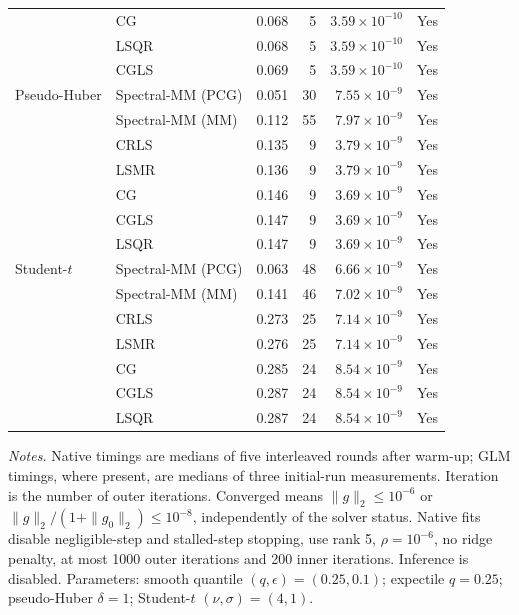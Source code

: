 \documentclass[10pt,a4paper]{article}
\begin{document}
\begin{longtable}{llrrrc}
 & CG & 0.068 & 5 & $3.59\times10^{-10}$ & Yes \\
 & LSQR & 0.068 & 5 & $3.59\times10^{-10}$ & Yes \\
 & CGLS & 0.069 & 5 & $3.59\times10^{-10}$ & Yes \\
\midrule
Pseudo-Huber & Spectral-MM (PCG) & 0.051 & 30 & $7.55\times10^{-9}$ & Yes \\
 & Spectral-MM (MM) & 0.112 & 55 & $7.97\times10^{-9}$ & Yes \\
 & CRLS & 0.135 & 9 & $3.79\times10^{-9}$ & Yes \\
 & LSMR & 0.136 & 9 & $3.79\times10^{-9}$ & Yes \\
 & CG & 0.146 & 9 & $3.69\times10^{-9}$ & Yes \\
 & CGLS & 0.147 & 9 & $3.69\times10^{-9}$ & Yes \\
 & LSQR & 0.147 & 9 & $3.69\times10^{-9}$ & Yes \\
\midrule
Student-$t$ & Spectral-MM (PCG) & 0.063 & 48 & $6.66\times10^{-9}$ & Yes \\
 & Spectral-MM (MM) & 0.141 & 46 & $7.02\times10^{-9}$ & Yes \\
 & CRLS & 0.273 & 25 & $7.14\times10^{-9}$ & Yes \\
 & LSMR & 0.276 & 25 & $7.14\times10^{-9}$ & Yes \\
 & CG & 0.285 & 24 & $8.54\times10^{-9}$ & Yes \\
 & CGLS & 0.287 & 24 & $8.54\times10^{-9}$ & Yes \\
 & LSQR & 0.287 & 24 & $8.54\times10^{-9}$ & Yes \\
\end{longtable}
\noindent\textit{Notes.} Native timings are medians of five interleaved rounds after warm-up; GLM timings, where present, are medians of three initial-run measurements. Iteration is the number of outer iterations. Converged means $\|g\|_2\leq10^{-6}$ or $\|g\|_2/(1+\|g_0\|_2)\leq10^{-8}$, independently of the solver status. Native fits disable negligible-step and stalled-step stopping, use rank 5, $\rho=10^{-6}$, no ridge penalty, at most 1000 outer iterations and 200 inner iterations. Inference is disabled.
Parameters: smooth quantile $(q,\epsilon)=(0.25,0.1)$; expectile $q=0.25$; pseudo-Huber $\delta=1$; Student-$t$ $(\nu,\sigma)=(4,1)$.
\par
\endgroup
\end{document}
